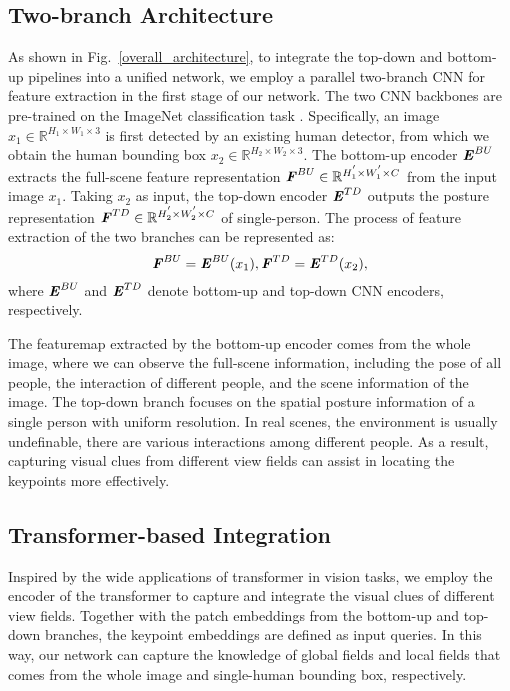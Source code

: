 \documentclass[runningheads]{llncs}
\begin{document}
\subsection{Two-branch Architecture}
As shown in Fig.~\ref{overall_architecture}, to integrate the top-down and bottom-up pipelines into a unified network, we employ a parallel two-branch CNN for feature extraction in the first stage of our network. The two CNN backbones are pre-trained on the ImageNet classification task \cite{ImageNet2015}. Specifically, an image $x_{1} \in {{\mathbb{R}}^{H_{1} \times W_{1} \times 3}}$ is first detected by an existing human detector, from which we obtain the human bounding box $x_{2} \in {{\mathbb{R}}^{H_{2} \times W_{2} \times 3}}$. 
The bottom-up encoder $\textbf{\textit{E}}_{}^{BU}$ extracts the full-scene feature representation ${\textbf{\textit{F}}_{}^{BU} \in {{\mathbb{R}}^{{H_{1}^{'}} \times {W_{1}^{'}} \times {C^{}}}}}$ from the input image $x_{1}$. Taking $x_{2}$ as input, the top-down encoder $\textbf{\textit{E}}_{}^{TD}$ outputs the posture representation ${\textbf{\textit{F}}_{}^{TD} \in {{\mathbb{R}}^{{H_{2}^{'}} \times {W_{2}^{'}} \times {C^{}}}}}$ of single-person. The process of feature extraction of the two branches can be represented as:
\begin{equation}
\label{equ1}
    \textbf{\textit{F}}_{}^{BU} = \textbf{\textit{E}}_{}^{BU}({x_1}), \textbf{\textit{F}}_{}^{TD} = \textbf{\textit{E}}_{}^{TD}({x_2}),
\end{equation}
where $\textbf{\textit{E}}_{}^{BU}$ and $\textbf{\textit{E}}_{}^{TD}$ denote bottom-up and top-down CNN encoders, respectively.

The featuremap extracted by the bottom-up encoder comes from the whole image, where we can observe the full-scene information, including the pose of all people, the interaction of different people, and the scene information of the image. The top-down branch focuses on the spatial posture information of a single person with uniform resolution. In real scenes, the environment is usually undefinable, there are various interactions among different people. As a result, capturing visual clues from different view fields can assist in locating the keypoints more effectively.

\subsection{Transformer-based Integration}
Inspired by the wide applications of transformer in vision tasks, we employ the encoder of the transformer to capture and integrate the visual clues of different view fields. 
Together with the patch embeddings from the bottom-up and top-down branches, the keypoint embeddings are defined as input queries. In this way, our network can capture the knowledge of global fields and local fields that comes from the whole image and single-human bounding box, respectively.
\end{document}
